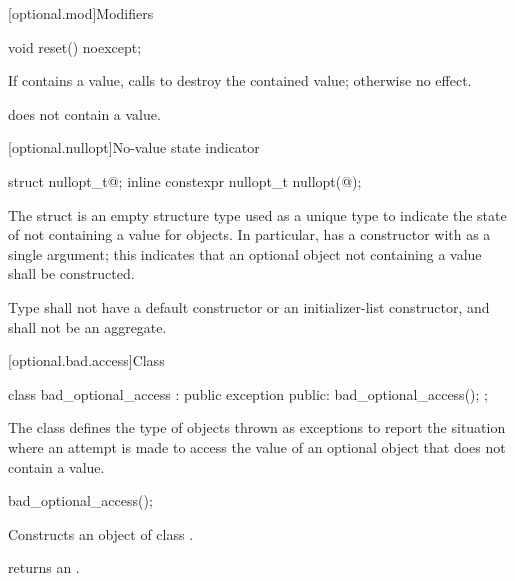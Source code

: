 [optional.mod]{Modifiers}

%
\begin{itemdecl}
void reset() noexcept;
\end{itemdecl}

\begin{itemdescr}
\pnum
\effects
If  contains a value, calls  to destroy the contained value;
otherwise no effect.

\pnum
\postconditions
{} does not contain a value.
\end{itemdescr}

[optional.nullopt]{No-value state indicator}

%
%
\begin{itemdecl}
struct nullopt_t{@\seebelow@};
inline constexpr nullopt_t nullopt(@\unspec@);
\end{itemdecl}

\pnum
The struct  is an empty structure type used as a unique type to indicate the state of not containing a value for  objects.
In particular,  has a constructor with  as a single argument;
this indicates that an optional object not containing a value shall be constructed.

\pnum
Type  shall not have a default constructor or an initializer-list constructor, and shall not be an aggregate.

[optional.bad.access]{Class }

\begin{codeblock}
class bad_optional_access : public exception {
public:
  bad_optional_access();
};
\end{codeblock}

\pnum
The class  defines the type of objects thrown as exceptions to report the situation where an attempt is made to access the value of an optional object that does not contain a value.

%
%
\begin{itemdecl}
bad_optional_access();
\end{itemdecl}

\begin{itemdescr}
\pnum
\effects
Constructs an object of class .

\pnum
\postconditions
{} returns an
\ntbs.
\end{itemdescr}

